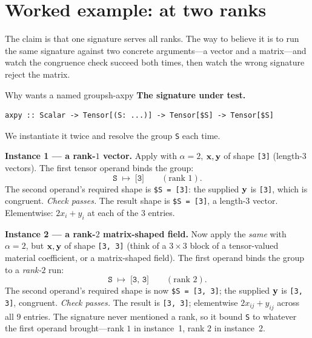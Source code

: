 \section{Worked example: \texorpdfstring{}{axpy} at two ranks}
\label{sec:sh-wex-axpy}

The claim is that one signature serves all ranks. The way to believe it is to
run the same signature against two concrete arguments---a vector and a
matrix---and watch the congruence check succeed both times, then watch the
wrong signature reject the matrix.

\begin{workedexample}{Why  wants a named group}{sh-axpy}
\textbf{The signature under test.}
\begin{lstlisting}[style=l4style]
axpy :: Scalar -> Tensor[(S: ...)] -> Tensor[$S] -> Tensor[$S]
\end{lstlisting}
We instantiate it twice and resolve the group \texttt{S} each time.

\tcblower
\textbf{Instance 1 --- a rank-$1$ vector.} Apply  with
$\alpha = 2$, $\mathbf{x},\mathbf{y}$ of shape \lstinline[style=l4style]|[3]| (length-$3$
vectors). The first tensor operand binds the group:
\[
  \texttt{S} \;\mapsto\; \texttt{[3]} \qquad(\text{rank } 1).
\]
The second operand's required shape is \lstinline[style=l4style]|$S = [3]|: the
supplied $\mathbf{y}$ is \lstinline[style=l4style]|[3]|, which is congruent.
\emph{Check passes.} The result shape is \lstinline[style=l4style]|$S = [3]|,
a length-$3$ vector. Elementwise: $2x_i + y_i$ at each of the $3$ entries.

\textbf{Instance 2 --- a rank-$2$ matrix-shaped field.} Now apply the
\emph{same}  with $\alpha = 2$, but $\mathbf{x},\mathbf{y}$ of shape
\lstinline[style=l4style]|[3, 3]| (think of a $3\times 3$ block of a
tensor-valued material coefficient, or a matrix-shaped field). The first
operand binds the group to a \emph{rank-$2$} run:
\[
  \texttt{S} \;\mapsto\; \texttt{[3, 3]} \qquad(\text{rank } 2).
\]
The second operand's required shape is now \lstinline[style=l4style]|$S = [3, 3]|;
the supplied $\mathbf{y}$ is \lstinline[style=l4style]|[3, 3]|, congruent.
\emph{Check passes.} The result is \lstinline[style=l4style]|[3, 3]|;
elementwise $2x_{ij} + y_{ij}$ across all $9$ entries. The signature never
mentioned a rank, so it bound \texttt{S} to whatever the first operand
brought---rank $1$ in instance~1, rank $2$ in instance~2.


\end{workedexample}
